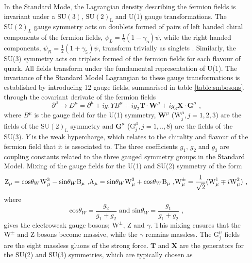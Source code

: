 %
In the Standard Mode, the Lagrangian density describing the fermion fields is invariant under a $\text{SU}(3)$, $\text{SU}(2)_{\text{L}}$ and U(1) gauge transformations.  The $\text{SU}(2)_{L}$ gauge symmetry acts on doublets formed of pairs of left handed chiral components of the fermion fields, $\psi_{L} = \frac{1}{2}(1-\gamma_{5})\psi$, while the right handed components, $\psi_{R} = \frac{1}{2}(1+\gamma_{5})\psi$, transform trivially as singlets \cite{Weinberg:1967tq}.  Similarly, the SU(3) symmetry acts on triplets formed of the fermion fields for each flavour of quark.  All fields transform under the fundamental representation of U(1).  The invariance of the Standard Model Lagrangian to these gauge transformations is established by introducing 12 gauge fields, summarised in table \ref{table:smbosons}, through the covariant derivate of the fermion fields
%
\begin{equation}
\partial^{\mu} \rightarrow D^{\mu} = \partial^{\mu} + ig_{1}YB^{\mu} + ig_{2} \textbf{T} \cdot \textbf{W}^{\mu} + ig_{3}\textbf{X} \cdot \textbf{G}^{\mu} \text{ ,}
\end{equation}
%
\noindent where $B^{\mu}$ is the gauge field for the U(1) symmetry, $\textbf{W}^{\mu}$ ($\text{W}^{\mu}_{j}, j =1,2,3$) are the fields of the $\text{SU}(2)_{\text{L}}$ symmetry and $\textbf{G}^{\mu}$ ($\text{G}^{\mu}_{j}, j =1,..,8$) are the fields of the SU(3).  $Y$ is the weak hypercharge, which relates to the chirality and flavour of the fermion field that it is associated to.  The three coefficients $g_{1}$, $g_{2}$ and $g_{3}$ are coupling constants related to the three gauged symmetry groups in the Standard Model.  Mixing of the gauge fields for the U(1) and SU(2) symmetry of the form
%
\begin{equation}
\text{Z}_{\mu} = \text{cos}{\theta_{W}} \text{W}^{3}_{\mu} - \text{sin}{\theta_{W}} \text{B}_{\mu} \text{ ,}\\
\text{A}_{\mu} = \text{sin}{\theta_{W}} \text{W}^{3}_{\mu} + \text{cos}{\theta_{W}} \text{B}_{\mu} \text{ ,}\\
\text{W}^{\pm}_{\mu} = \frac{1}{\sqrt{2}}(\text{W}^{1}_{\mu} \mp i \text{W}^{2}_{\mu}) \text{ ,}
\end{equation}
%
\noindent where
%
\begin{equation}
\text{cos}{\theta_{W}} = \frac{g_{2}}{g_{1}+g_{2}} \text{ and } \text{sin}{\theta_{W}} = \frac{g_{1}}{g_{1}+g_{2}} \text{ ,}
\end{equation}
%
\noindent gives the electroweak gauge bosons; $\text{W}^{\pm}$, Z and $\gamma$.  This mixing ensures that the $\text{W}^{\pm}$ and Z bosons become massive, while the $\gamma$ remains massless.  The $\text{G}^{\mu}_{j}$ fields are the eight massless gluons of the strong force.   $\textbf{T}$ and $\textbf{X}$ are the generators for the SU(2) and SU(3) symmetries, which are typically chosen as
